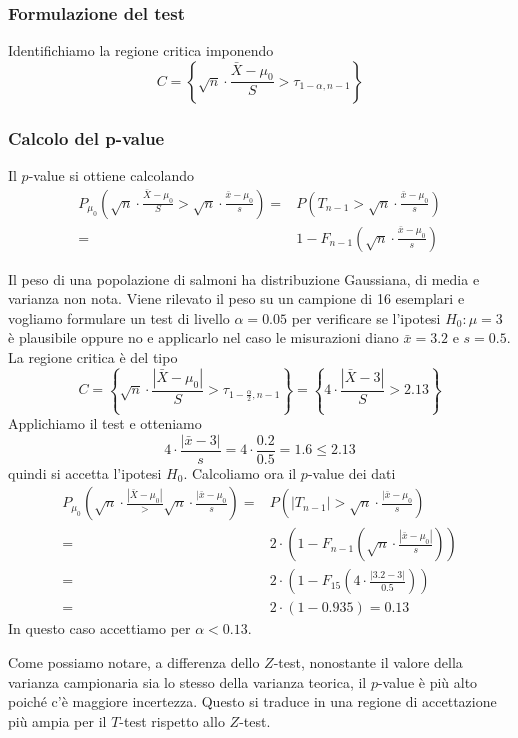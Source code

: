 \subsubsection{Formulazione del test}
Identifichiamo la regione critica imponendo
\[ C = \left\{ \sqrt{n} \cdot \frac{\bar{X} - \mu_0}{S} > \tau_{1 - \alpha, n-1} \right\} \]

\subsubsection{Calcolo del p-value}
Il $p$-value si ottiene calcolando
\begin{align*}
	P_{\mu_0} \left( \sqrt{n} \cdot \frac{\bar{X} - \mu_0}{S} >
	\sqrt{n} \cdot \frac{\bar{x} - \mu_0}{s} \right) = &
	P \left( T_{n-1} > \sqrt{n} \cdot \frac{\bar{x} - \mu_0}{s} \right) \\
	=                                                  &
	1 - F_{n-1} \left( \sqrt{n} \cdot \frac{\bar{x} - \mu_0}{s} \right)
\end{align*}

\begin{example}
	Il peso di una popolazione di salmoni ha distribuzione Gaussiana, di media e varianza non nota.
	Viene rilevato il peso su un campione di 16 esemplari e vogliamo formulare un test di livello
	$\alpha = 0.05$ per verificare se l'ipotesi $H_0 : \mu = 3$ è plausibile oppure no e applicarlo
	nel caso le misurazioni diano $\bar{x} = 3.2$ e $s = 0.5$. La regione critica è del tipo
	\[
		C = \left\{ \sqrt{n} \cdot \frac{|\bar{X} - \mu_0|}{S}
		> \tau_{1 - \frac{\alpha}{2}, n-1} \right\} =
		\left\{ 4 \cdot \frac{|\bar{X} - 3|}{S} > 2.13 \right\}
	\]
	Applichiamo il test e otteniamo
	\[ 4 \cdot \frac{|\bar{x} - 3|}{s} = 4 \cdot \frac{0.2}{0.5} = 1.6 \leq 2.13 \]
	quindi si accetta l'ipotesi $H_0$. Calcoliamo ora il $p$-value dei dati
	\begin{align*}
		P_{\mu_0} \left( \sqrt{n} \cdot \frac{|\bar{X} - \mu_0|} >
		\sqrt{n} \cdot \frac{|\bar{x} - \mu_0}{s} \right) = &
		P \left( |T_{n-1}| > \sqrt{n} \cdot \frac{|\bar{x} - \mu_0}{s} \right)                 \\
		=                                                   &
		2 \cdot \left( 1 - F_{n-1} \left( \sqrt{n} \cdot
		\frac{|\bar{x} - \mu_0|}{s} \right) \right)                                            \\
		=                                                   &
		2 \cdot \left( 1 - F_{15} \left( 4 \cdot \frac{|3.2 - 3|}{0.5} \right) \right)         \\
		=                                                   & 2 \cdot \left( 1 - 0.935 \right)
		= 0.13
	\end{align*}
	In questo caso accettiamo per $\alpha < 0.13$.
\end{example}

Come possiamo notare, a differenza dello $Z$-test, nonostante il valore della varianza campionaria
sia lo stesso della varianza teorica, il $p$-value è più alto poiché c'è maggiore incertezza.
Questo si traduce in una regione di accettazione più ampia per il $T$-test rispetto allo $Z$-test.